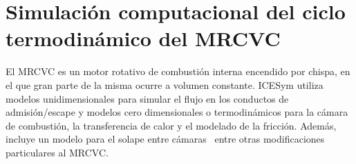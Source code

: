 \section{Simulación computacional del ciclo termodinámico del MRCVC}

El MRCVC es un motor rotativo de combustión interna encendido por chispa, en el
que gran parte de la misma ocurre a volumen constante.
%
ICESym utiliza modelos unidimensionales para simular el flujo en los conductos
de admisión/escape y modelos cero dimensionales o termodinámicos para la cámara
de combustión, la transferencia de calor y el modelado de la fricción.
%
Además, incluye un modelo para el solape entre cámaras~\cite{lopez16} entre
otras modificaciones particulares al MRCVC.\@

%
